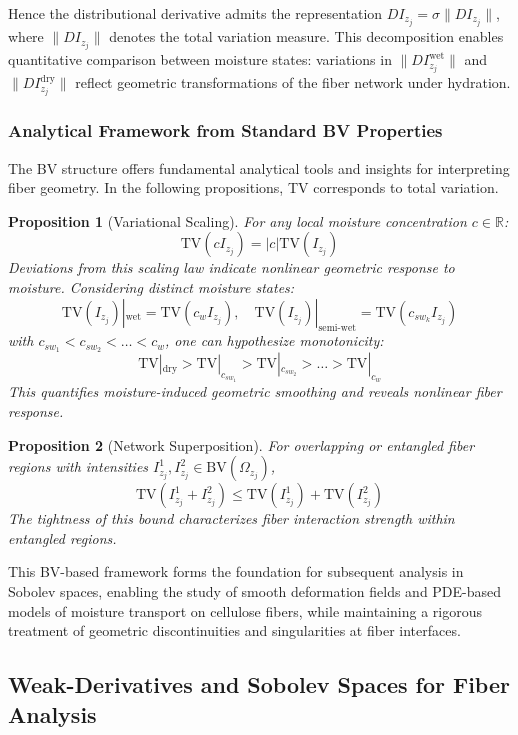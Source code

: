 \documentclass[11pt]{article}
\newtheorem{proposition}{Proposition}
\begin{document}
Hence the distributional derivative admits the representation $DI_{z_j} = \sigma \|DI_{z_j}\|$, where $\|DI_{z_j}\|$ denotes the total variation measure. This decomposition enables quantitative comparison between moisture states: variations in $\|DI_{z_j}^{\text{wet}}\|$ and $\|DI_{z_j}^{\text{dry}}\|$ reflect geometric transformations of the fiber network under hydration. 

\subsubsection{Analytical Framework from Standard BV Properties}

The BV structure offers fundamental analytical tools and insights for interpreting fiber geometry. In the following propositions, TV corresponds to total variation.

\begin{proposition} [Variational Scaling] For any local moisture concentration $c\in\mathbb{R}$:
\[
\text{TV}(cI_{z_j}) = |c| \text{TV}(I_{z_j})
\]
Deviations from this scaling law indicate nonlinear geometric response to moisture. Considering distinct moisture states:
\[
\text{TV}(I_{z_j})|_{\text{wet}} = \text{TV}(c_w I_{z_j}), \quad 
\text{TV}(I_{z_j})|_{\text{semi-wet}} = \text{TV}(c_{sw_k} I_{z_j})
\]
with $c_{sw_1} < c_{sw_2} < \dots < c_w$, one can hypothesize monotonicity:
\[
\text{TV}|_{\text{dry}} > \text{TV}|_{c_{sw_1}} > \text{TV}|_{c_{sw_2}} > \dots > \text{TV}|_{c_w}
\]
This quantifies moisture-induced geometric smoothing and reveals nonlinear fiber response.
\end{proposition}

\begin{proposition} [Network Superposition] For overlapping or entangled fiber regions with intensities $I_{z_j}^1, I_{z_j}^2 \in \text{BV}(\Omega_{z_j})$,
\[
\text{TV}(I_{z_j}^1 + I_{z_j}^2) \leq \text{TV}(I_{z_j}^1) + \text{TV}(I_{z_j}^2)
\]
The tightness of this bound characterizes fiber interaction strength within entangled regions. 
\end{proposition}

This BV-based framework forms the foundation for subsequent analysis in Sobolev spaces, enabling the study of smooth deformation fields and PDE-based models of moisture transport on cellulose fibers, while maintaining a rigorous treatment of geometric discontinuities and  singularities at fiber interfaces. 

\subsection{Weak-Derivatives and Sobolev Spaces for Fiber Analysis}
\end{document}
